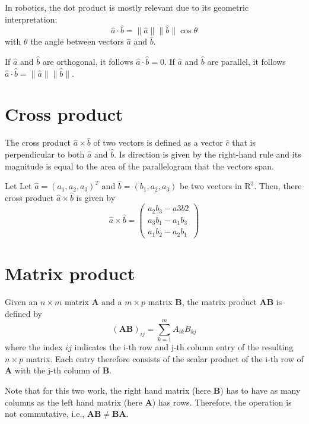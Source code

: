 \documentclass[paper=6.14in:9.21in,pagesize=pdftex,11pt,twoside,openright]{scrbook}
\begin{document}
In robotics, the dot product is mostly relevant due to its geometric interpretation:
\begin{equation}
\hat{a}\cdot\hat{b}=\|\hat{a}\|\|\hat{b}\|\cos\theta
\end{equation}
with $\theta$ the angle between vectors $\hat{a}$ and $\hat{b}$. 

If $\hat{a}$ and $\hat{b}$ are orthogonal, it follows $\hat{a}\cdot\hat{b}=0$. If $\hat{a}$ and $\hat{b}$ are parallel, it follows $\hat{a}\cdot\hat{b}=\|\hat{a}\|\|\hat{b}\|$.  

\section{Cross product}
The cross product $\hat{a} \times \hat{b}$ of two vectors is defined as a vector $\hat{c}$ that is perpendicular to both $\hat{a}$ and $\hat{b}$. Is direction is given by the right-hand rule and its magnitude is equal to the area of the parallelogram that the vectors span.  

Let Let $\hat{a}=(a_1,a_2,a_3)^T$ and $\hat{b}=(b_1,a_2,a_3)$ be two vectors in $\mathrm{R}^3$. Then, there cross product $\hat{a}\times\hat{b}$ is given by
\begin{equation}
\hat{a}\times\hat{b}=\left(
\begin{array}{l}
a_2b_3-a3b2\\
a_3b_1-a_1b_3\\
a_1b_2-a_2b_1
\end{array}
\right)
\end{equation}


\section{Matrix product}
Given an $n \times m$ matrix $\mathbf{A}$ and a $m\times p$ matrix $\mathbf{B}$, the matrix product $\mathbf{AB}$ is defined by
\begin{equation}
(\mathbf{AB})_{ij}=\sum_{k=1}^mA_{ik}B_{kj}
\end{equation}
where the index $ij$ indicates the i-th row and j-th column entry of the resulting $n\times p $ matrix. Each entry therefore consists of the scalar product of the i-th row of $\mathbf{A}$ with the j-th column of $\mathbf{B}$. 

Note that for this two work, the right hand matrix (here $\mathbf{B}$) has to have as many columns as the left hand matrix (here $\mathbf{A}$) has rows. Therefore, the operation is not commutative, i.e., $\mathbf{AB}\neq\mathbf{BA}$.
\end{document}
